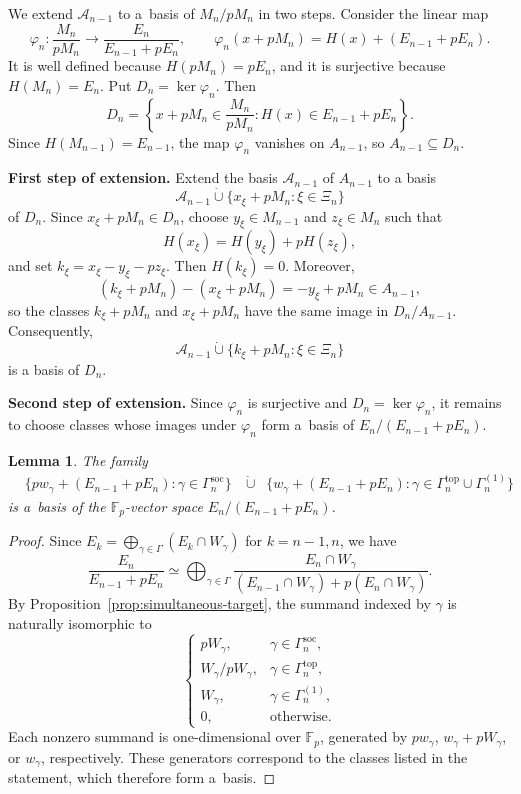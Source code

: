 \documentclass[11pt]{article}
\newtheorem{lem}[thm]{Lemma}
\theoremstyle{definition}
\begin{document}
We extend $\mathcal A_{n-1}$ to a~basis of $M_n/pM_n$
in two steps. Consider the linear map
$$
\varphi_n:\frac{M_n}{pM_n}\longrightarrow
\frac{E_n}{E_{n-1}+pE_n},
\qquad
\varphi_n(x+pM_n)=H(x)+(E_{n-1}+pE_n).
$$
It is well defined because $H(pM_n)=pE_n$, and it is
surjective because $H(M_n)=E_n$. Put $D_n=\ker\varphi_n$.
Then
$$
D_n=
\left\{
x+pM_n\in\frac{M_n}{pM_n}:
H(x)\in E_{n-1}+pE_n
\right\}.
$$
Since $H(M_{n-1})=E_{n-1}$, the map $\varphi_n$ vanishes
on $A_{n-1}$, so $A_{n-1}\subseteq D_n$.

\medskip
\noindent\textbf{First step of extension.}
Extend the basis $\mathcal A_{n-1}$ of $A_{n-1}$ to a basis
\[
\mathcal A_{n-1}\mathbin{\dot\cup}
\{x_\xi+pM_n:\xi\in \Xi_{n}\}
\]
of $D_n$. Since $x_\xi+pM_n\in D_n$, choose
$y_\xi\in M_{n-1}$ and $z_\xi\in M_n$ such that
\[
H(x_\xi)=H(y_\xi)+pH(z_\xi),
\]
and set $k_\xi=x_\xi-y_\xi-pz_\xi$. Then $H(k_\xi)=0$.
Moreover,
\[
(k_\xi+pM_n)-(x_\xi+pM_n)
=-y_\xi+pM_n\in A_{n-1},
\]
so the classes $k_\xi+pM_n$ and $x_\xi+pM_n$ have the same
image in $D_n/A_{n-1}$. Consequently,
\[
\mathcal A_{n-1}\mathbin{\dot\cup}
\{k_\xi+pM_n:\xi\in \Xi_n\}
\]
is a basis of $D_n$.


\medskip
\noindent\textbf{Second step of extension.}
Since $\varphi_n$ is surjective and $D_n=\ker\varphi_n$,
it remains to choose classes whose images under $\varphi_n$
form a~basis of $E_n/(E_{n-1}+pE_n)$.



\begin{lem}\label{lem:quotient-En}
	The family
	$$
	\begin{aligned}
		&\bigl\{
		pw_\gamma+(E_{n-1}+pE_n):
		\gamma\in\Gamma_n^{\mathrm{soc}}
		\bigr\}
		&\mathbin{\dot\cup}\;\;
		\bigl\{
		w_\gamma+(E_{n-1}+pE_n):
		\gamma\in\Gamma_n^{\mathrm{top}}\cup\Gamma_n^{(1)}
		\bigr\}
	\end{aligned}
	$$
	is a~basis of the $\mathbb F_p$-vector space
	$E_n/(E_{n-1}+pE_n)$.
\end{lem}

\begin{proof}
	Since $E_k=\bigoplus_{\gamma\in\Gamma}(E_k\cap W_\gamma)$
	for $k=n-1,n$, we have
	$$
	\frac{E_n}{E_{n-1}+pE_n}
	\simeq
	\bigoplus_{\gamma\in\Gamma}
	\frac{E_n\cap W_\gamma}
	{(E_{n-1}\cap W_\gamma)+p(E_n\cap W_\gamma)}.
	$$
	By Proposition~\ref{prop:simultaneous-target}, the summand
	indexed by $\gamma$ is naturally isomorphic to
	$$
	\begin{cases}
		pW_\gamma,&\gamma\in\Gamma_n^{\mathrm{soc}},\\
		W_\gamma/pW_\gamma,&\gamma\in\Gamma_n^{\mathrm{top}},\\
		W_\gamma,&\gamma\in\Gamma_n^{(1)},\\
		0,&\text{otherwise}.
	\end{cases}
	$$
	Each nonzero summand is one-dimensional over $\mathbb F_p$,
	generated by $pw_\gamma$, $w_\gamma+pW_\gamma$, or $w_\gamma$,
	respectively. These generators correspond to the classes
	listed in the statement, which therefore form a~basis.
\end{proof}
\end{document}
